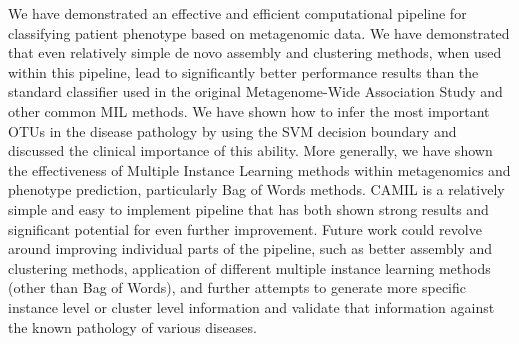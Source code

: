 
We have demonstrated an effective and efficient computational pipeline for classifying patient phenotype based on metagenomic data. We have demonstrated that even relatively simple de novo assembly and clustering methods, when used within this pipeline, lead to significantly better performance results than the standard classifier used in the original Metagenome-Wide Association Study and other common MIL methods. We have shown how to infer the most important OTUs in the disease pathology by using the SVM decision boundary and discussed the clinical importance of this ability. More generally, we have shown the effectiveness of Multiple Instance Learning methods within metagenomics and phenotype prediction, particularly Bag of Words methods. CAMIL is a relatively simple and easy to implement pipeline that has both shown strong results and significant potential for even further improvement. Future work could revolve around improving individual parts of the pipeline, such as better assembly and clustering methods, application of different multiple instance learning methods (other than Bag of Words), and further attempts to generate more specific instance level or cluster level information and validate that information against the known pathology of various diseases.